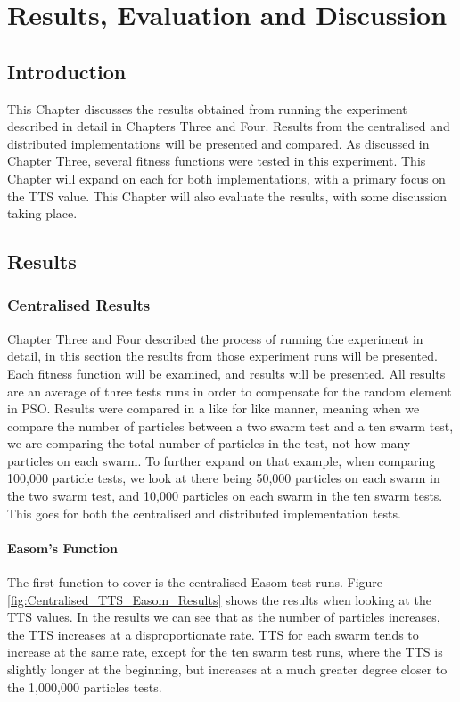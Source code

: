\documentclass[oneside,12pt]{book}
\begin{document}
\chapter{Results, Evaluation and Discussion}
\section{Introduction}
This Chapter discusses the results obtained from running the experiment described in detail in Chapters Three and Four. Results from the centralised and distributed implementations will be presented and compared. As discussed in Chapter Three, several fitness functions were tested in this experiment. This Chapter will expand on each for both implementations, with a primary focus on the TTS value. This Chapter will also evaluate the results, with some discussion taking place. 

\section{Results}
\subsection{Centralised Results}
Chapter Three and Four described the process of running the experiment in detail, in this section the results from those experiment runs will be presented. Each fitness function will be examined, and results will be presented. All results are an average of three tests runs in order to compensate for the random element in PSO. Results were compared in a like for like manner, meaning when we compare the number of particles between a two swarm test and a ten swarm test, we are comparing the total number of particles in the test, not how many particles on each swarm. To further expand on that example, when comparing 100,000 particle tests, we look at there being 50,000 particles on each swarm in the two swarm test, and 10,000 particles on each swarm in the ten swarm tests. This goes for both the centralised and distributed implementation tests. 

\subsubsection{Easom's Function}
The first function to cover is the centralised Easom test runs. Figure \ref{fig:Centralised_TTS_Easom_Results} shows the results when looking at the TTS values. In the results we can see that as the number of particles increases, the TTS increases at a disproportionate rate. TTS for each swarm tends to increase at the same rate, except for the ten swarm test runs, where the TTS is slightly longer at the beginning, but increases at a much greater degree closer to the 1,000,000 particles tests.
\end{document}
